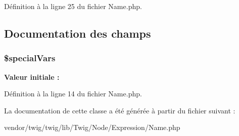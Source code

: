 Définition à la ligne 25 du fichier Name.\+php.



\subsection{Documentation des champs}
\subsubsection[{\texorpdfstring{\$special\+Vars}{$specialVars}}]{\setlength{\rightskip}{0pt plus 5cm}\$special\+Vars\hspace{0.3cm}{\ttfamily [protected]}}\hypertarget{class_twig___node___expression___name_a501eec646ef05064ff71a3d11874906b}{}\label{class_twig___node___expression___name_a501eec646ef05064ff71a3d11874906b}
{\bfseries Valeur initiale \+:}


Définition à la ligne 14 du fichier Name.\+php.



La documentation de cette classe a été générée à partir du fichier suivant \+:\begin{DoxyCompactItemize}
\item 
vendor/twig/twig/lib/\+Twig/\+Node/\+Expression/Name.\+php\end{DoxyCompactItemize}
